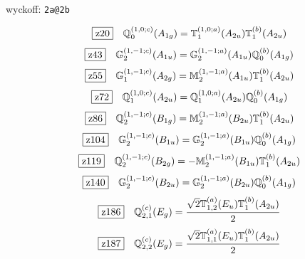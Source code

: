 \documentclass[fleqn,10pt,landscape]{jsarticle}
\begin{document}
\noindent\quad * wyckoff: \texttt{2a@2b}

\begin{dmath*}
\hspace*{3mm}\fbox{z20}\quad \mathbb{Q}_{0}^{(1,0;c)}(A_{1g})=\mathbb{T}_{1}^{(1,0;a)}(A_{2u}) \mathbb{T}_{1}^{(b)}(A_{2u})
\end{dmath*}
\begin{dmath*}
\hspace*{3mm}\fbox{z43}\quad \mathbb{G}_{2}^{(1,-1;c)}(A_{1u})=\mathbb{G}_{2}^{(1,-1;a)}(A_{1u}) \mathbb{Q}_{0}^{(b)}(A_{1g})
\end{dmath*}
\begin{dmath*}
\hspace*{3mm}\fbox{z55}\quad \mathbb{G}_{1}^{(1,-1;c)}(A_{2g})=\mathbb{M}_{2}^{(1,-1;a)}(A_{1u}) \mathbb{T}_{1}^{(b)}(A_{2u})
\end{dmath*}
\begin{dmath*}
\hspace*{3mm}\fbox{z72}\quad \mathbb{Q}_{1}^{(1,0;c)}(A_{2u})=\mathbb{Q}_{1}^{(1,0;a)}(A_{2u}) \mathbb{Q}_{0}^{(b)}(A_{1g})
\end{dmath*}
\begin{dmath*}
\hspace*{3mm}\fbox{z86}\quad \mathbb{Q}_{2}^{(1,-1;c)}(B_{1g})=\mathbb{M}_{2}^{(1,-1;a)}(B_{2u}) \mathbb{T}_{1}^{(b)}(A_{2u})
\end{dmath*}
\begin{dmath*}
\hspace*{3mm}\fbox{z104}\quad \mathbb{G}_{2}^{(1,-1;c)}(B_{1u})=\mathbb{G}_{2}^{(1,-1;a)}(B_{1u}) \mathbb{Q}_{0}^{(b)}(A_{1g})
\end{dmath*}
\begin{dmath*}
\hspace*{3mm}\fbox{z119}\quad \mathbb{Q}_{2}^{(1,-1;c)}(B_{2g})=- \mathbb{M}_{2}^{(1,-1;a)}(B_{1u}) \mathbb{T}_{1}^{(b)}(A_{2u})
\end{dmath*}
\begin{dmath*}
\hspace*{3mm}\fbox{z140}\quad \mathbb{G}_{2}^{(1,-1;c)}(B_{2u})=\mathbb{G}_{2}^{(1,-1;a)}(B_{2u}) \mathbb{Q}_{0}^{(b)}(A_{1g})
\end{dmath*}
\begin{dmath*}
\hspace*{3mm}\fbox{z186}\quad \mathbb{Q}_{2,1}^{(c)}(E_{g})=\frac{\sqrt{2} \mathbb{T}_{1,2}^{(a)}(E_{u}) \mathbb{T}_{1}^{(b)}(A_{2u})}{2}
\end{dmath*}
\begin{dmath*}
\hspace*{3mm}\fbox{z187}\quad \mathbb{Q}_{2,2}^{(c)}(E_{g})=\frac{\sqrt{2} \mathbb{T}_{1,1}^{(a)}(E_{u}) \mathbb{T}_{1}^{(b)}(A_{2u})}{2}
\end{dmath*}
\end{document}
